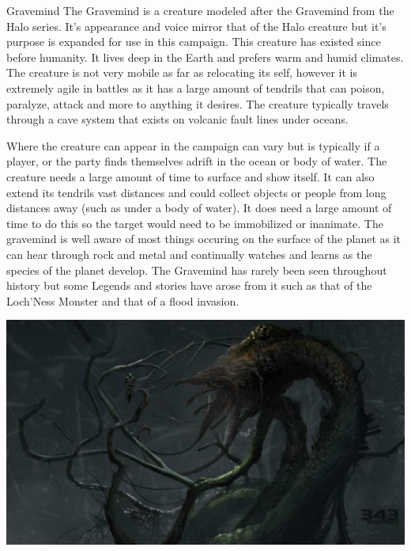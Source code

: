 \begin{commentbox}{Gravemind}	
	The Gravemind is a creature modeled after the Gravemind from the Halo series. It's appearance and voice mirror that of the Halo creature but it's purpose is expanded for use in this campaign. This creature has existed since before humanity. It lives deep in the Earth and prefers warm and humid climates. The creature is not very mobile as far as relocating its self, however it is extremely agile in battles as it has a large amount of tendrils that can poison, paralyze, attack and more to anything it desires. The creature typically travels through a cave system that exists on volcanic fault lines under oceans. 
	
	Where the creature can appear in the campaign can vary but is typically if a player, or the party finds themselves adrift in the ocean or body of water. The creature needs a large amount of time to surface and show itself. It can also extend its tendrils vast distances and could collect objects or people from long distances away (such as under a body of water). It does need a large amount of time to do this so the target would need to be immobilized or inanimate. The gravemind is well aware of most things occuring on the surface of the planet as it can hear through rock and metal and continually watches and learns as the species of the planet develop. The Gravemind has rarely been seen throughout history but some Legends and stories have arose from it such as that of the Loch'Ness Monster and that of a flood invasion.
	
	\begin{center}
		\includegraphics[width=0.6\linewidth]{img/gravemind.jpg}
	\end{center}
\end{commentbox}

